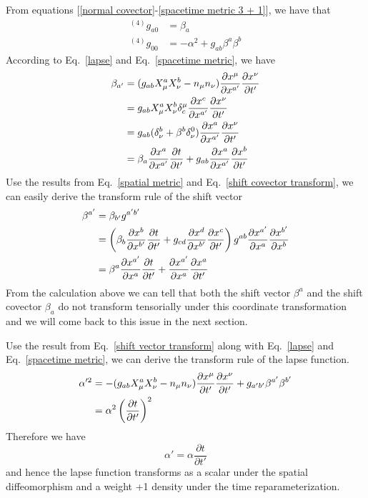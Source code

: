 \documentclass[letterpaper,nofootinbib,prd,amsmath,onecolumn]{revtex4-1}
\begin{document}
From equations [\ref{normal covector}-\ref{spacetime metric 3 + 1}], we have that
\begin{align}
^{(4)}g_{a0} & = \beta_{a}\label{lapse}\\
^{(4)}g_{00} & = -\alpha^2 + g_{ab}\beta^{a}\beta^{b}\label{shift}
\end{align}
According to Eq.~\ref{lapse} and Eq.~\ref{spacetime metric}, we have
\begin{align}
\beta_{a'} & = (g_{ab}X^{a}_{\mu}X^{b}_{\nu} - n_{\mu}n_{\nu})\frac{\partial x^{\mu}}{\partial x^{a'}}\frac{\partial x^{\nu}}{\partial t'}\notag\\
& = g_{ab}X^{a}_{\mu}X^{b}_{\nu}\delta_{c}^{\mu}\frac{\partial x^{c}}{\partial x^{a'}}\frac{\partial x^{\nu}}{\partial t'}\notag\\
& = g_{ab}(\delta^{b}_{\nu} + \beta^{b}\delta^{0}_{\nu})\frac{\partial x^{a}}{\partial x^{a'}}\frac{\partial x^{\nu}}{\partial t'}\notag\\
& = \beta_{a}\frac{\partial x^{a}}{\partial x^{a'}}\frac{\partial t}{\partial t'} + g_{ab}\frac{\partial x^{a}}{\partial x^{a'}}\frac{\partial x^{b}}{\partial t'}\label{shift covector transform}
\end{align}
Use the results from Eq.~\ref{spatial metric} and Eq.~\ref{shift covector transform}, we can easily derive the transform rule of the shift vector
\begin{align}
\beta^{a'} & = \beta_{b'}g^{a'b'}\notag\\
& = \left(\beta_{b}\frac{\partial x^{b}}{\partial x^{b'}}\frac{\partial t}{\partial t'} + g_{cd}\frac{\partial x^{d}}{\partial x^{b'}}\frac{\partial x^{c}}{\partial t'}\right)g^{ab}\frac{\partial x^{a'}}{\partial x^{a}}\frac{\partial x^{b'}}{\partial x^{b}}\notag\\
& = \beta^{a}\frac{\partial x^{a'}}{\partial x^{a}}\frac{\partial t}{\partial t'} + \frac{\partial x^{a'}}{\partial x^{a}}\frac{\partial x^{a}}{\partial t'}\label{shift vector transform}
\end{align}
From the calculation above we can tell that both the shift vector $\beta^{a}$ and the shift covector $\beta_{a}$ do not transform tensorially under this coordinate transformation and we will come back to this issue in the next section. 

Use the result from Eq.~\ref{shift vector transform} along with Eq.~\ref{lapse} and Eq.~\ref{spacetime metric}, we can derive the transform rule of the lapse function. 
\begin{align*}
\alpha'^{2} & = - (g_{ab}X^{a}_{\mu}X^{b}_{\nu} - n_{\mu}n_{\nu})\frac{\partial x^{\mu}}{\partial t'}\frac{\partial x^{\nu}}{\partial t'} + g_{a'b'}\beta^{a'}\beta^{b'}\notag\\ 
& = \alpha^2\left(\frac{\partial t}{\partial t'}\right)^{2}
\end{align*}
Therefore we have
\begin{equation}
\alpha' = \alpha\frac{\partial t}{\partial t'}\label{lapse transform}
\end{equation}
and hence the lapse function transforms as a scalar under the spatial diffeomorphism and a weight +1 density under the time reparameterization. 
 
\end{document}
